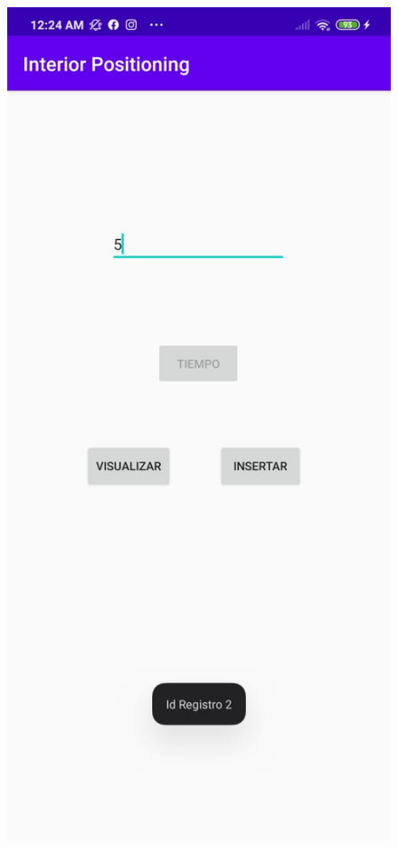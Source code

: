 \documentclass[conference,compsoc,onecolumn]{IEEEtran}
\begin{document}
\begin{figure}[H]
    \centering
    \includegraphics[scale=0.5]{bib/5.PNG}
    \label{fig:1}
\end{figure}
\end{document}

